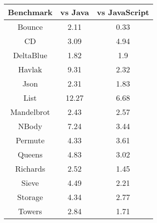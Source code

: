 \begin{tabular}{c | c c}
\hline
Benchmark & vs Java & vs JavaScript \\
\hline\hline

Bounce & 2.11 & 0.33 \\
\hline

CD & 3.09 & 4.94 \\
\hline

DeltaBlue & 1.82 & 1.9 \\
\hline

Havlak & 9.31 & 2.32 \\
\hline

Json & 2.31 & 1.83 \\
\hline

List & 12.27 & 6.68 \\
\hline

Mandelbrot & 2.43 & 2.57 \\
\hline

NBody & 7.24 & 3.44 \\
\hline

Permute & 4.33 & 3.61 \\
\hline

Queens & 4.83 & 3.02 \\
\hline

Richards & 2.52 & 1.45 \\
\hline

Sieve & 4.49 & 2.21 \\
\hline

Storage & 4.34 & 2.77 \\
\hline

Towers & 2.84 & 1.71 \\
\hline

\end{tabular}